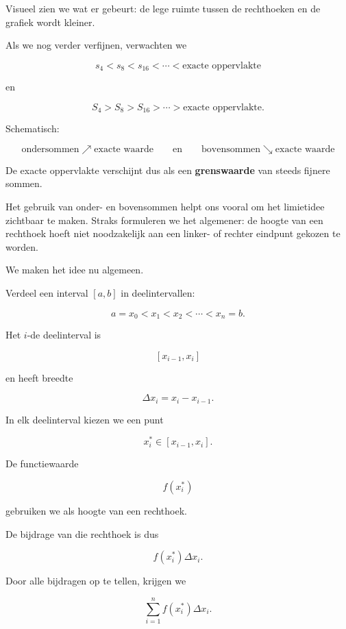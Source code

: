 \documentclass{ximera}
\begin{document}
Visueel zien we wat er gebeurt: de lege ruimte tussen de rechthoeken en
de grafiek wordt kleiner.

Als we nog verder verfijnen, verwachten we

\[
s_4<s_8<s_{16}<\cdots<\text{exacte oppervlakte}
\]

en

\[
S_4>S_8>S_{16}>\cdots>\text{exacte oppervlakte}.
\]

Schematisch:

\[
\boxed{
\text{ondersommen}
\nearrow
\text{exacte waarde}
\qquad\text{en}\qquad
\text{bovensommen}
\searrow
\text{exacte waarde}
}
\]

De exacte oppervlakte verschijnt dus als een \textbf{grenswaarde} van
steeds fijnere sommen.

\begin{opmerking}
Het gebruik van onder- en bovensommen helpt ons vooral om het
limietidee zichtbaar te maken. Straks formuleren we het algemener:
de hoogte van een rechthoek hoeft niet noodzakelijk aan een linker- of
rechter eindpunt gekozen te worden.
\end{opmerking}




We maken het idee nu algemeen.

Verdeel een interval \([a,b]\) in deelintervallen:

\[
a=x_0<x_1<x_2<\cdots<x_n=b.
\]

Het \(i\)-de deelinterval is

\[
[x_{i-1},x_i]
\]

en heeft breedte

\[
\Delta x_i=x_i-x_{i-1}.
\]

In elk deelinterval kiezen we een punt

\[
x_i^\ast\in[x_{i-1},x_i].
\]

De functiewaarde

\[
f(x_i^\ast)
\]

gebruiken we als hoogte van een rechthoek.

De bijdrage van die rechthoek is dus

\[
f(x_i^\ast)\Delta x_i.
\]

Door alle bijdragen op te tellen, krijgen we

\[
\boxed{
\sum_{i=1}^{n} f(x_i^\ast)\Delta x_i
}.
\]
\end{document}
